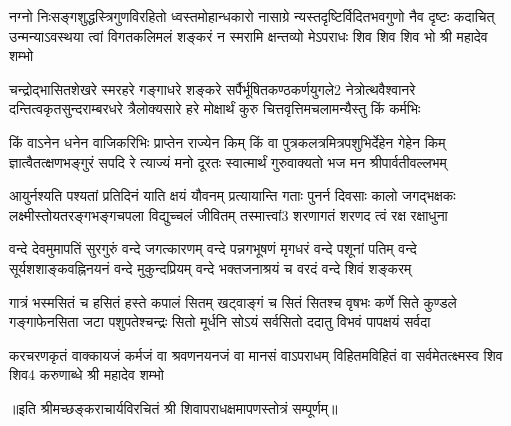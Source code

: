 \fourlineindentedshloka
{नग्नो निःसङ्गशुद्धस्त्रिगुणविरहितो ध्वस्तमोहान्धकारो}
{नासाग्रे न्यस्तदृष्टिर्विदितभवगुणो नैव दृष्टः कदाचित्}
{उन्मन्याऽवस्थया त्वां विगतकलिमलं शङ्करं न स्मरामि}
{क्षन्तव्यो मेऽपराधः शिव शिव शिव भो श्री महादेव शम्भो} %

\fourlineindentedshloka
{चन्द्रोद्भासितशेखरे स्मरहरे गङ्गाधरे शङ्करे}
{सर्पैर्भूषितकण्ठकर्णयुगले2 नेत्रोत्थवैश्वानरे}
{दन्तित्वकृतसुन्दराम्बरधरे त्रैलोक्यसारे हरे}
{मोक्षार्थं कुरु चित्तवृत्तिमचलामन्यैस्तु किं कर्मभिः} %


\fourlineindentedshloka
{किं वाऽनेन धनेन वाजिकरिभिः प्राप्तेन राज्येन किम्}
{किं वा पुत्रकलत्रमित्रपशुभिर्देहेन गेहेन किम्}
{ज्ञात्वैतत्क्षणभङ्गुरं सपदि रे त्याज्यं मनो दूरतः}
{स्वात्मार्थं गुरुवाक्यतो भज मन श्रीपार्वतीवल्लभम्} %

\fourlineindentedshloka
{आयुर्नश्यति पश्यतां प्रतिदिनं याति क्षयं यौवनम्}
{प्रत्यायान्ति गताः पुनर्न दिवसाः कालो जगद्भक्षकः}
{लक्ष्मीस्तोयतरङ्गभङ्गचपला विद्युच्चलं जीवितम्}
{तस्मात्त्वां3 शरणागतं शरणद त्वं रक्ष रक्षाधुना} %


\fourlineindentedshloka
{वन्दे देवमुमापतिं सुरगुरुं वन्दे जगत्कारणम्}
{वन्दे पन्नगभूषणं मृगधरं वन्दे पशूनां पतिम्}
{वन्दे सूर्यशशाङ्कवह्निनयनं वन्दे मुकुन्दप्रियम्}
{वन्दे भक्तजनाश्रयं च वरदं वन्दे शिवं शङ्करम्} %

\fourlineindentedshloka
{गात्रं भस्मसितं च हसितं हस्ते कपालं सितम्}
{खट्वाङ्गं च सितं सितश्च वृषभः कर्णे सिते कुण्डले}
{गङ्गाफेनसिता जटा पशुपतेश्चन्द्रः सितो मूर्धनि}
{सोऽयं सर्वसितो ददातु विभवं पापक्षयं सर्वदा} %

\fourlineindentedshloka
{करचरणकृतं वाक्कायजं कर्मजं वा}
{श्रवणनयनजं वा मानसं वाऽपराधम्}
{विहितमविहितं वा सर्वमेतत्क्ष्मस्व}
{शिव शिव4 करुणाब्धे श्री महादेव शम्भो} %


॥इति श्रीमच्छङ्कराचार्यविरचितं श्री शिवापराधक्षमापणस्तोत्रं सम्पूर्णम्॥
